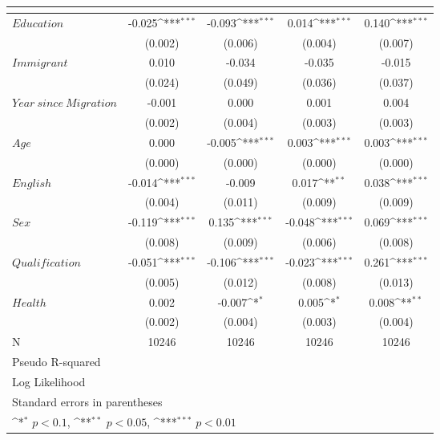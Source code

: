 {
\def\sym#1{\ifmmode^{#1}\else\(^{#1}\)\fi}
\begin{tabular}{l*{4}{c}}
\hline\hline
            &\multicolumn{1}{c}{} &\multicolumn{1}{c}{} &\multicolumn{1}{c}{} &\multicolumn{1}{c}{} \\
\hline
$\mathit{Education}$&      -0.025\sym{***}&      -0.093\sym{***}&       0.014\sym{***}&       0.140\sym{***}\\
            &     (0.002)         &     (0.006)         &     (0.004)         &     (0.007)         \\
$\mathit{Immigrant}$&       0.010         &      -0.034         &      -0.035         &      -0.015         \\
            &     (0.024)         &     (0.049)         &     (0.036)         &     (0.037)         \\
$\mathit{Year\ since\ Migration}$&      -0.001         &       0.000         &       0.001         &       0.004         \\
            &     (0.002)         &     (0.004)         &     (0.003)         &     (0.003)         \\
$\mathit{Age}$&       0.000         &      -0.005\sym{***}&       0.003\sym{***}&       0.003\sym{***}\\
            &     (0.000)         &     (0.000)         &     (0.000)         &     (0.000)         \\
$\mathit{English}$&      -0.014\sym{***}&      -0.009         &       0.017\sym{**} &       0.038\sym{***}\\
            &     (0.004)         &     (0.011)         &     (0.009)         &     (0.009)         \\
$\mathit{Sex}$&      -0.119\sym{***}&       0.135\sym{***}&      -0.048\sym{***}&       0.069\sym{***}\\
            &     (0.008)         &     (0.009)         &     (0.006)         &     (0.008)         \\
$\mathit{Qualification}$&      -0.051\sym{***}&      -0.106\sym{***}&      -0.023\sym{***}&       0.261\sym{***}\\
            &     (0.005)         &     (0.012)         &     (0.008)         &     (0.013)         \\
$\mathit{Health}$&       0.002         &      -0.007\sym{*}  &       0.005\sym{*}  &       0.008\sym{**} \\
            &     (0.002)         &     (0.004)         &     (0.003)         &     (0.004)         \\
\hline
N           &       10246         &       10246         &       10246         &       10246         \\
Pseudo R-squared&                     &                     &                     &                     \\
Log Likelihood&                     &                     &                     &                     \\
\hline\hline
\multicolumn{5}{l}{\footnotesize Standard errors in parentheses}\\
\multicolumn{5}{l}{\footnotesize \sym{*} \(p<0.1\), \sym{**} \(p<0.05\), \sym{***} \(p<0.01\)}\\
\end{tabular}
}
